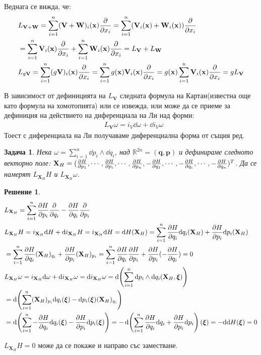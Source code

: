 \documentclass[12pt]{article}
\newtheorem{problem}{Задача}
\newtheorem*{solution*}{Решение}
\newcommand\myxi[0]{\boldsymbol{\xi}}
\begin{document}
\begin{large}
Веднага се вижда, че:
\begin{align*}
&L_{\mathbf{V}+\mathbf{W}}= \sum_{i=1}^{n}(\mathbf{V}+\mathbf{W})_i(\mathbf{x})\pdv{}{x_i} = \sum_{i=1}^{n}(\mathbf{V}_i(\mathbf{x})+\mathbf{W}_i(\mathbf{x}))\pdv{}{x_i} \\
&=\sum_{i=1}^{n}\mathbf{V}_i(\mathbf{x})\pdv{}{x_i}+\sum_{i=1}^{n}\mathbf{W}_i(\mathbf{x})\pdv{}{x_i} = L_{\mathbf{V}} + L_{\mathbf{W}} \\
&L_{g\mathbf{V}}= \sum_{i=1}^{n}(g\mathbf{V})_i(\mathbf{x})\pdv{}{x_i} = \sum_{i=1}^{n}g(\mathbf{x})\mathbf{V}_i(\mathbf{x})\pdv{}{x_i} = g(\mathbf{x})\sum_{i=1}^{n}\mathbf{V}_i(\mathbf{x})\pdv{}{x_i} = g L_{\mathbf{V}} \\
\end{align*}

В зависимост от дефиницията на $L_\mathbf{V}$ следната формула на Картан(известна още като формула на хомотопията) или се извежда, или може да се приеме за дефиниция на действието на диференциала на Ли над форми:
\begin{align*}
&L_\mathbf{V}\omega=i_V \dd \omega + \dd i_V \omega
\end{align*}
Тоест с диференциала на Ли получаваме диференциална форма от същия ред.


\begin{problem}
Нека $\omega = \sum_{i=1}^n \dd p_i \wedge \dd q_i$, над $\mathbb{R}^{2n}=(\mathbf{q},\mathbf{p})$ и дефинираме следното векторно поле: $\mathbf{X}_H=(\pdv{H}{p_1},\cdots,\pdv{H}{p_i},\cdots,\pdv{H}{p_n},-\pdv{H}{q_1},\cdots,-\pdv{H}{q_i},\cdots,-\pdv{H}{q_n})^T$. Да се намерят $L_{\mathbf{X}_H}H$ и $L_{\mathbf{X}_H}\omega$.
\end{problem}

\begin{solution*}
\begin{align*}
&L_{\mathbf{X}_H}=\sum_{i=1}^n \pdv{H}{p_i}\pdv{}{q_i}-\pdv{H}{q_i}\pdv{}{p_i} \\
&L_{\mathbf{X}_H} H = i_{\mathbf{X}_H} \dd H + \dd i_{\mathbf{X}_H} H = i_{\mathbf{X}_H} \dd H = \dd H(\mathbf{X}_H) = \sum_{i=1}^n \pdv{H}{q_i} \dd q_i(\mathbf{X}_H) + \pdv{H}{p_i} \dd p_i(\mathbf{X}_H) \\
&=\sum_{i=1}^n \pdv{H}{q_i} (\mathbf{X}_H)_{q_i} + \pdv{H}{p_i}  (\mathbf{X}_H)_{p_i} = \sum_{i=1}^n \pdv{H}{q_i} \pdv{H}{p_i} + \pdv{H}{p_i} (-\pdv{H}{q_i}) = 0 \\
&L_{\mathbf{X}_H} \omega = i_{\mathbf{X}_H} \dd \omega + \dd i_{\mathbf{X}_H} \omega = \dd i_{\mathbf{X}_H} \omega = \dd (\sum_{i=1}^n \dd p_i \wedge \dd q_i (\mathbf{X}_H,\myxi)) \\
&= \dd (\sum_{i=1}^n (\mathbf{X}_H)_{p_i} \dd q_i(\myxi) - \dd p_i(\myxi) (\mathbf{X}_H)_{q_i} )  \\
&=\dd(\sum_{i=1}^n -\pdv{H}{q_i} \dd q_i(\myxi) - \pdv{H}{p_i} \dd p_i(\myxi)) = - \dd(\sum_{i=1}^n \pdv{H}{q_i} \dd q_i + \pdv{H}{p_i} \dd p_i)(\myxi) = - \dd \dd H (\myxi) = 0
\end{align*}
\end{solution*}
$L_{\mathbf{X}_H} H = 0$ може да се покаже и направо със заместване.


\end{large}
\end{document}
